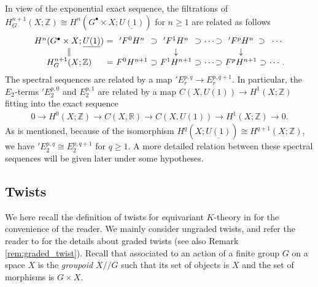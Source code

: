 \documentclass[pdftex]{sigma}
\theoremstyle{definition}
\newcommand{\R}{\mathbb{R}}
\newcommand{\Z}{\mathbb{Z}}
\begin{document}
In view of the exponential exact sequence, the f\/iltrations of $H^{n+1}_G(X; \Z) \cong H^{n}(G^\bullet \times X; \underline{U(1)})$ for $n \ge 1$ are related as follows
\begin{gather*}
\begin{array}{c@{}c@{}c@{}c@{}c@{}c@{}c@{}c@{}c@{}c@{}c}
H^n(G^\bullet \times X; \underline{U(1)}) & \ = \ &
{}'F^0H^n & \ \supset \ &
{}'F^{1}H^n & \ \supset \ &
\cdots & \supset \ &
{}'F^{p}H^n & \supset \ &
\cdots \\
\parallel & &
 & &
\downarrow & &
& &
\downarrow & &
 \\
H^{n+1}_G(X; \Z) & \ = \ &
F^0H^{n+1} & \ \supset \ &
F^{1}H^{n+1} & \ \supset \ &
\cdots & \supset \ &
F^{p}H^{n+1} & \ \supset \ &
\cdots.
\end{array}
\end{gather*}
The spectral sequences are related by a map ${}'E^{p, q}_r \to E^{p, q+1}_r$. In particular, the $E_2$-terms ${}'E_2^{p, 0}$ and $E_2^{p, 1}$ are related by a map $C(X, U(1)) \to H^1(X; \Z)$ f\/itting into the exact sequence
\begin{gather*}
0 \to H^0(X; \Z) \to C(X, \R) \to C(X, U(1)) \to H^1(X; \Z) \to 0.
\end{gather*}
As is mentioned, because of the isomorphism $H^q(X; \underline{U(1)}) \cong H^{q+1}(X; \Z)$, we have ${}'E_2^{p, q} \cong E_2^{p, q+1}$ for $q \ge 1$. A more detailed relation between these spectral sequences will be given later under some hypotheses.

\subsection{Twists}\label{subsec:twist}

We here recall the def\/inition of twists for equivariant $K$-theory in \cite{FHT,F-M} for the convenience of the reader. We mainly consider ungraded twists, and refer the reader to \cite{FHT} for the details about graded twists (see also Remark \ref{rem:graded_twist}). Recall that associated to an action of a f\/inite group $G$ on a space $X$ is the \textit{groupoid} $X/\!/G$ such that its set of objects is $X$ and the set of morphisms is $G \times X$.
\end{document}

